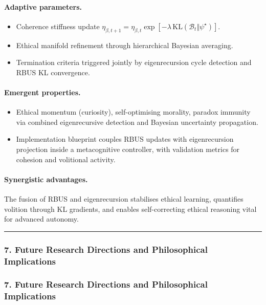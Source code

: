 \documentclass[12pt]{article}
\begin{document}
\paragraph{Adaptive parameters.}
\begin{itemize}
\item Coherence stiffness update $\eta_{\beta,t+1} = \eta_{\beta,t} \exp[-\lambda\, \mathrm{KL}(\mathcal{B}_t\Vert \psi^\star)]$.
\item Ethical manifold refinement through hierarchical Bayesian averaging.
\item Termination criteria triggered jointly by eigenrecursion cycle detection and RBUS KL convergence.
\end{itemize}

\paragraph{Emergent properties.}
\begin{itemize}
\item Ethical momentum (curiosity), self-optimising morality, paradox immunity via combined eigenrecursive detection and Bayesian uncertainty propagation.
\item Implementation blueprint couples RBUS updates with eigenrecursion projection inside a metacognitive controller, with validation metrics for cohesion and volitional activity.
\end{itemize}

\paragraph{Synergistic advantages.}
The fusion of RBUS and eigenrecursion stabilises ethical learning, quantifies volition through KL gradients, and enables self-correcting ethical reasoning vital for advanced autonomy.

\begin{center}\rule{0.5\linewidth}{0.5pt}\end{center}

\subsubsection{\texorpdfstring{\textbf{7. Future Research Directions and
Philosophical
Implications}}{7. Future Research Directions and Philosophical Implications}}\label{future-research-directions-and-philosophical-implications}
\subsubsection{\texorpdfstring{\textbf{7. Future Research Directions and
Philosophical
Implications}}{7. Future Research Directions and Philosophical Implications}}\label{future-research-directions-and-philosophical-implications}
\end{document}
